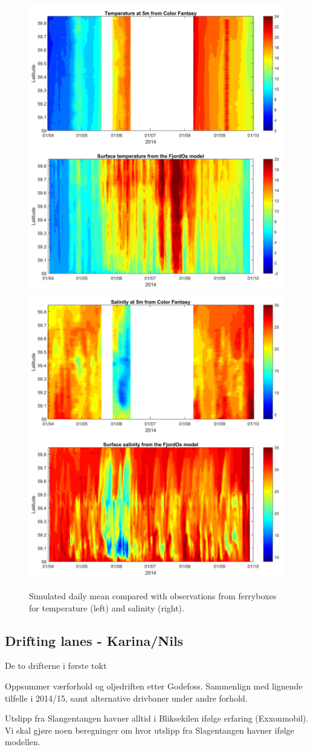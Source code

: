\begin{figure}[ht]
\centerline{
\includegraphics*[trim=1cm 0cm 1cm 0cm,clip=true,width=.5\textwidth]{Figurer/FjordOs_vs_Ferrybox_TEMP}
\includegraphics*[trim=1cm 0cm 1cm 0cm,clip=true,width=.5\textwidth]{Figurer/FjordOs_vs_Ferrybox_SALT}}
\caption{\small
Simulated daily mean compared with observations from ferryboxes for temperature (left) and salinity (right).}
\label{fig:Ferrybox_temp_salt}
\end{figure}


\clearpage 

\subsection{Drifting lanes - Karina/Nils}

De to drifterne i f\o rste tokt

Oppsummer v\ae rforhold og oljedriften etter Godefoss. Sammenlign med lignende tilfelle i 2014/15, samt alternative drivbaner under andre forhold.

Utslipp fra Slangentangen havner alltid i Bliksekilen if\o lge erfaring (Exxonmobil). Vi skal gj\o re noen beregninger om hvor utslipp fra Slagentangen havner if\o lge modellen. 

